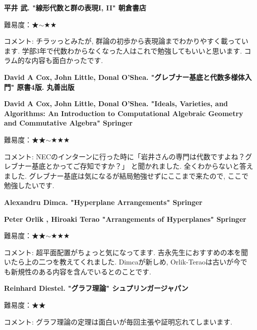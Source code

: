 \textbf{平井 武. "線形代数と群の表現I, II" 朝倉書店}  　\vspace{-6pt} 


難易度：★$\sim$★★ 　 　\vspace{-6pt} 

コメント: チラッっとみたが, 群論の初歩から表現論までわかりやすく載っています. 学部3年で代数わからなくなった人はこれで勉強してもいいと思います. コラム的な内容も面白かったです. 

\vspace{8pt}




\textbf{David A Cox, John Little, Donal O'Shea. "グレブナー基底と代数多様体入門" 原書4版. 丸善出版}  　\vspace{-6pt} 

\textbf{David A Cox, John Little, Donal O'Shea. "Ideals, Varieties, and Algorithms: An Introduction to Computational Algebraic Geometry and Commutative Algebra" Springer}  　\vspace{-6pt} 

難易度：★★$\sim$★★★\vspace{-6pt} 

コメント: NECのインターンに行った時に「岩井さんの専門は代数ですよね？グレブナー基底とかってご存知ですか？」
と聞かれました. 全くわからないと答えました. 
グレブナー基底は気になるが結局勉強せずにここまで来たので, ここで勉強したいです. 
\vspace{8pt}


\textbf{Alexandru Dimca. "Hyperplane Arrangements" Springer}  　\vspace{-6pt} 

\textbf{Peter Orlik , Hiroaki Terao "Arrangements of Hyperplanes" Springer}  　\vspace{-6pt} 

難易度：★★$\sim$★★★\vspace{-6pt} 

コメント: 超平面配置がちょっと気になってます. 吉永先生におすすめの本を聞いたら上の二つを教えてくれました. Dimcaが新しめ, Orlik-Teraoは古いが今でも新規性のある内容を含んでいるとのことです. 
\vspace{8pt}


\textbf{Reinhard Diestel. "グラフ理論" シュプリンガージャパン}  　\vspace{-6pt} 

難易度：★★\vspace{-6pt} 

コメント: グラフ理論の定理は面白いが毎回主張や証明忘れてしまいます. 
\vspace{8pt}

